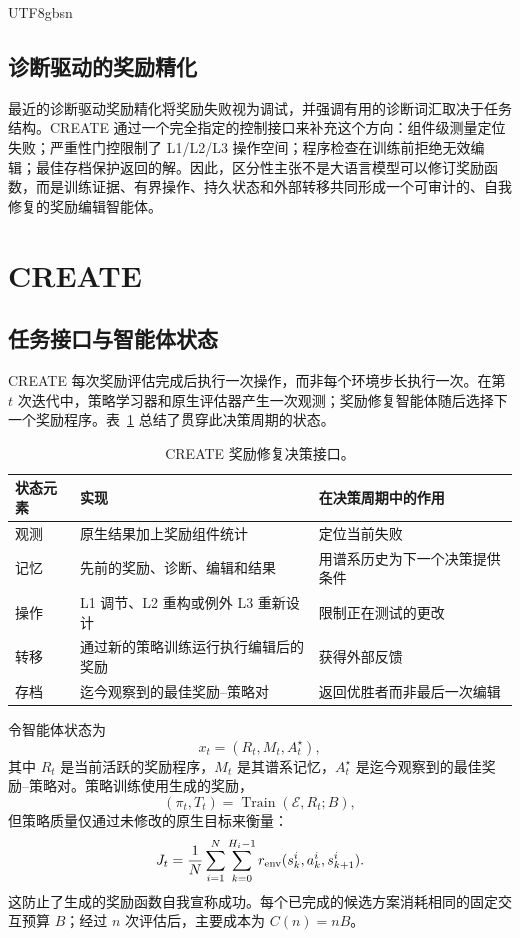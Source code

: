 \documentclass[conference]{IEEEtran}
\begin{document}
\begin{CJK}{UTF8}{gbsn}
\subsection{诊断驱动的奖励精化}
最近的诊断驱动奖励精化将奖励失败视为调试，并强调有用的诊断词汇取决于任务结构。CREATE 通过一个完全指定的控制接口来补充这个方向：组件级测量定位失败；严重性门控限制了 L1/L2/L3 操作空间；程序检查在训练前拒绝无效编辑；最佳存档保护返回的解。因此，区分性主张不是大语言模型可以修订奖励函数，而是训练证据、有界操作、持久状态和外部转移共同形成一个可审计的、自我修复的奖励编辑智能体。

\section{CREATE}

\subsection{任务接口与智能体状态}
CREATE 每次奖励评估完成后执行一次操作，而非每个环境步长执行一次。在第 $t$ 次迭代中，策略学习器和原生评估器产生一次观测；奖励修复智能体随后选择下一个奖励程序。表~\ref{tab:agent} 总结了贯穿此决策周期的状态。

\begin{table}[t]
\caption{CREATE 奖励修复决策接口。}
\label{tab:agent}
\centering
\scriptsize
\setlength{\tabcolsep}{3.1pt}
\begin{tabular}{p{}p{}p{}}
\toprule
状态元素 & 实现 & 在决策周期中的作用 \\
\midrule
观测 & 原生结果加上奖励组件统计 & 定位当前失败 \\
记忆 & 先前的奖励、诊断、编辑和结果 & 用谱系历史为下一个决策提供条件 \\
操作 & L1 调节、L2 重构或例外 L3 重新设计 & 限制正在测试的更改 \\
转移 & 通过新的策略训练运行执行编辑后的奖励 & 获得外部反馈 \\
存档 & 迄今观察到的最佳奖励--策略对 & 返回优胜者而非最后一次编辑 \\
\bottomrule
\end{tabular}
\end{table}

令智能体状态为
\begin{equation}
x_t=(R_t,M_t,A_t^\star),
\label{eq:state}
\end{equation}
其中 $R_t$ 是当前活跃的奖励程序，$M_t$ 是其谱系记忆，$A_t^\star$ 是迄今观察到的最佳奖励--策略对。策略训练使用生成的奖励，
\begin{equation}
(\pi_t,T_t)=\operatorname{Train}(\mathcal{E},R_t;B),
\label{eq:train}
\end{equation}
但策略质量仅通过未修改的原生目标来衡量：
\begin{equation}
J_t=\frac{1}{N}\sum_{i=1}^{N}\sum_{k=0}^{H_i-1}
r_{\rm env}(s_k^i,a_k^i,s_{k+1}^i).
\label{eq:native}
\end{equation}
这防止了生成的奖励函数自我宣称成功。每个已完成的候选方案消耗相同的固定交互预算 $B$；经过 $n$ 次评估后，主要成本为 $C(n)=nB$。


\end{CJK}
\end{document}
